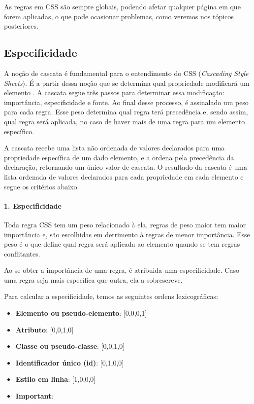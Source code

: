 As regras em CSS são sempre globais,
podendo afetar qualquer página em que forem aplicadas, o que pode ocasionar
problemas, como veremos nos tópicos posteriores.

\hypertarget{especificidade}{%
\subsection{Especificidade}\label{especificidade}}

A noção de cascata é fundamental para o entendimento do CSS (\emph{Cascading
Style Sheets}). É a partir dessa noção que se determina qual propriedade
modificará um elemento \cite{friedman}. A cascata segue três passos para determinar essa
modificação: importância, especificidade e fonte. Ao final desse
processo, é assinalado um peso para cada regra. Esse peso determina qual
regra terá precedência e, sendo assim, qual regra será aplicada, no caso
de haver mais de uma regra para um elemento específico. \nocite{cascading}

A cascata recebe uma lista não ordenada de valores declarados para uma
propriedade específica de um dado elemento, e a ordena pela precedência
da declaração, retornando um único valor de cascata. O resultado da
cascata é uma lista ordenada de valores declarados para cada propriedade
em cada elemento e segue os critérios abaixo.

\hypertarget{especificidade-1}{%
\paragraph{1. Especificidade}\label{especificidade-1}}

Toda regra CSS tem um peso relacionado à ela, regras de peso maior tem
maior importância e, são escolhidas em detrimento à regras de menor importância. Esse peso é o que define qual regra será aplicada ao
elemento quando se tem regras conflitantes.

Ao se obter a importância de uma regra, é atribuida uma especificidade.
Caso uma regra seja mais específica que outra, ela a sobrescreve.

Para calcular a especificidade, temos as seguintes ordens lexicográficas: 

\begin{itemize}
\tightlist
\item
  \textbf{Elemento ou pseudo-elemento}: {[}0,0,0,1{]}
  \item
  \textbf{Atributo}: {[}0,0,1,0{]}
  \item
  \textbf{Classe ou pseudo-classe}: {[}0,0,1,0{]}
  \item
  \textbf{Identificador único (id)}: {[}0,1,0,0{]}
  \item
  \textbf{Estilo em linha}: {[}1,0,0,0{]}
  \item
  \textbf{Important}:
\end{itemize}


